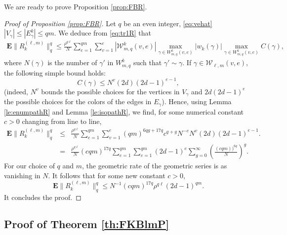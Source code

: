 \documentclass[11pt]{article}
\newcommand{\dE}{\mathbf {E}}
\newcommand{\cW}{\mathcal {W}}
\newcommand{\PAR}[1]{{{\left(#1\right)}}} %
\newcommand{\1}{1\!\!{\sf I}}
\begin{document}
We are ready to prove Proposition \ref{prop:FBR}.

\begin{proof}[Proof of Proposition \ref{prop:FBR}] Let $q$ be an even integer,  \eqref{eq:vehat} $|V_\gamma| \leq |E^k_\gamma | \leq q m$. We deduce from \eqref{eq:tr1R} that
\begin{eqnarray*}
\dE \| R_k^{(\ell,m)} \|_{q}^{q}  \leq \frac {\rho^{q \ell } }{N} \sum_{e=1}^{qm} \sum_{v =1}^e |\cW^k_{m,q} (v,e) |\max_{ \gamma \in W^k_{m,q} (v,e) } | w_k(\gamma) | \max_{ \gamma  \in W^k_{m,q} (v,e)} C(\gamma), \end{eqnarray*}
where $N(\gamma)$ is the number of $\gamma'$ in $W^k_{m,q}$ such that $\gamma'\sim \gamma$. 
If $\gamma \in \cW_{\ell,m} (v,e)$, the following simple bound holds:
$$
C(\gamma) \leq N^v (2d) (2d-1)^{e-1},
$$
(indeed, $N^v$ bounds the possible choices for the vertices in $V_\gamma$ and $2d(2d-1)^e$ the possible choices for the colors 
of the edges in $E_\gamma$). Hence, using Lemma \ref{le:enumpathR} and Lemma \ref{le:isopathR}, we find, for some numerical constant $c>0$ changing from line to line,
\begin{eqnarray*}
\dE \| R_k^{(\ell,m)} \|_{q}^{q}  & \leq  & \frac {\rho^{q \ell } }{N} \sum_{e=1}^{qm} \sum_{v =1}^e   (q m )^{6q g   + 17 q } c^{q + g} N^{-e} N^v (2d) (2d-1)^{e-1} .
\\
& = &  \frac{\rho^{ q \ell}}{N} (c qm)^{17 q}   \sum_{e=1}^{qm} \sum_{e =1}^{qm}  (2d-1)^e \sum_{ g = 0 } ^{\infty} \PAR{  \frac{ ( c q m) )^{6 q } }{N} }^{g}.
 \end{eqnarray*}
For our choice of $q$ and $m$, the geometric rate of the geometric series is as vanishing in $N$. It follows that for some new constant $ c > 0$, 
$$
\dE \| R_k^{(\ell,m)} \|_{q}^{q}   \leq  N^{-1} (c qm)^{17 q}  \rho^{ q \ell} (2d-1)^{qm}.
$$
It concludes the proof.
\end{proof}

\subsection{Proof of Theorem \ref{th:FKBlmP}}
\end{document}
